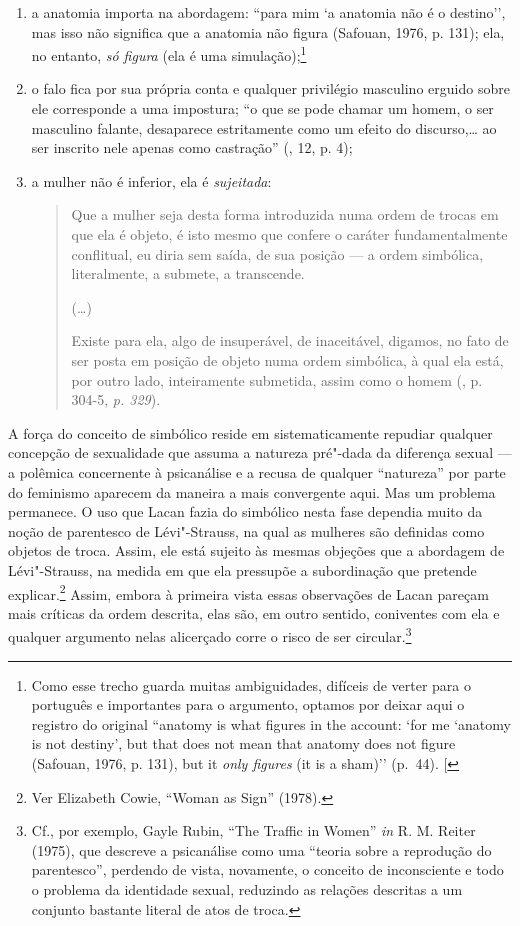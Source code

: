 \begin{enumerate}
\def\labelenumi{\arabic{enumi})}
\item
  a anatomia importa na abordagem: ``para mim `a anatomia não é o
  destino'', mas isso não significa que a anatomia não figura (Safouan,
  1976, p. 131); ela, no entanto, \emph{só figura} (ela é uma
  simulação);\footnote{Como esse trecho guarda muitas ambiguidades,
    difíceis de verter para o português e importantes para o argumento,
    optamos por deixar aqui o registro do original ``anatomy is what
    figures in the account: `for me `anatomy is not destiny', but that
    does not mean that anatomy does not figure (Safouan, 1976, p. 131),
    but it \emph{only figures} (it is a sham)'' (p.~44). {[}\versal{N.~T.}{]}}
\item
  o falo fica por sua própria conta e qualquer privilégio masculino
  erguido sobre ele corresponde a uma impostura; ``o que se pode chamar
  um homem, o ser masculino falante, desaparece estritamente como um
  efeito do discurso,\ldots{} ao ser inscrito nele apenas como castração''
  (, 12, p. 4);
\item
  a mulher não é inferior, ela é \emph{sujeitada}:
\begin{quote}
Que a mulher seja desta forma introduzida numa ordem de trocas em que
ela é objeto, é isto mesmo que confere o caráter fundamentalmente
conflitual, eu diria sem saída, de sua posição --- a ordem simbólica,
literalmente, a submete, a transcende.

(\ldots{})

Existe para ela, algo de insuperável, de inaceitável, digamos, no fato
de ser posta em posição de objeto numa ordem simbólica, à qual ela está,
por outro lado, inteiramente submetida, assim como o homem (, p.
304-5, \emph{p. 329}).
\end{quote}
\end{enumerate}

A força do conceito de simbólico reside em sistematicamente repudiar
qualquer concepção de sexualidade que assuma a natureza pré"-dada da
diferença sexual --- a polêmica concernente à psicanálise e a recusa de
qualquer ``natureza'' por parte do feminismo aparecem da maneira a mais
convergente aqui. Mas um problema permanece. O uso que Lacan fazia do
simbólico nesta fase dependia muito da noção de parentesco de
Lévi"-Strauss, na qual as mulheres são definidas como objetos de troca.
Assim, ele está sujeito às mesmas objeções que a abordagem de
Lévi"-Strauss, na medida em que ela pressupõe a subordinação que pretende
explicar.\footnote{Ver Elizabeth Cowie, ``Woman as Sign'' (1978).}
Assim, embora à primeira vista essas observações de Lacan pareçam mais
críticas da ordem descrita, elas são, em outro sentido, coniventes com
ela e qualquer argumento nelas alicerçado corre o risco de ser
circular.\footnote{Cf., por exemplo, Gayle Rubin, ``The Traffic in Women''
  \emph{in} R. M. Reiter (1975), que descreve a psicanálise como uma
  ``teoria sobre a reprodução do parentesco'', perdendo de vista,
  novamente, o conceito de inconsciente e todo o problema da identidade
  sexual, reduzindo as relações descritas a um conjunto bastante literal
  de atos de troca.}

